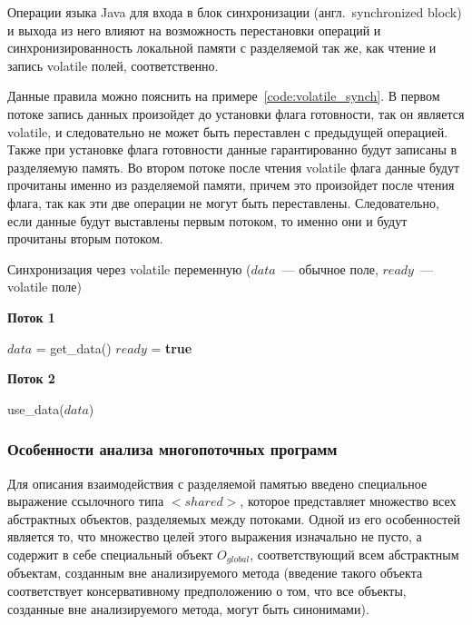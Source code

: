 \documentclass[14pt,titlepage]{extarticle}
\newcommand{\algorithmictitle}[1]{\hspace{8mm}\textbf{#1}}
\newcommand{\BOOLTRUE}{\textbf{true }}
\newcommand{\eng}[1]{{\English#1}}
\newcommand{\engdef}[1]{(англ.~\eng{#1})}
\newcommand{\java}{\eng{Java}\xspace}
\begin{document}
      Операции языка \java для входа в блок синхронизации \engdef{synchronized
      block} и выхода из него влияют на возможность перестановки операций и
      синхронизированность локальной памяти с разделяемой так же, как чтение и
      запись \eng{volatile} полей, соответственно.

      Данные правила можно пояснить на примере~\ref{code:volatile_synch}.
      В первом потоке запись данных произойдет до установки флага готовности,
      так он является \eng{volatile}, и следовательно не может быть переставлен
      с предыдущей операцией. Также при установке флага готовности данные
      гарантированно будут записаны в разделяемую память.
      Во втором потоке после чтения \eng{volatile} флага данные будут прочитаны
      именно из разделяемой памяти, причем это произойдет после чтения флага,
      так как эти две операции не могут быть переставлены.
      Следовательно, если данные будут выставлены первым потоком, то именно
      они и будут прочитаны вторым потоком.
      \begin{algorithm}
        \caption{Синхронизация через \eng{volatile} переменную
          ($data$~--- обычное поле, $ready$~--- \eng{volatile} поле)}
        \label{code:volatile_synch}
        \begin{multicols}{2}
          \algorithmictitle{Поток 1}
          \begin{algorithmic}[1]
            \STATE $data$ = get\_data()
            \STATE $ready$ = \BOOLTRUE
          \end{algorithmic}
          \columnbreak
          \algorithmictitle{Поток 2}
          \begin{algorithmic}[1]
            \STATE {}
            \ENDWHILE
            \STATE use\_data($data$)
          \end{algorithmic}
        \end{multicols}
      \end{algorithm}

      \subsubsection{Особенности анализа многопоточных программ}
        \label{sec:shared_introd}

        Для описания взаимодействия с разделяемой памятью введено специальное
        выражение ссылочного типа ${<}shared{>}$, которое представляет
        множество всех абстрактных объектов, разделяемых между потоками. Одной
        из его особенностей является то, что множество целей этого выражения
        изначально не пусто, а содержит в себе специальный объект
        $O_{global}$, соответствующий всем абстрактным объектам, созданным
        вне анализируемого метода (введение такого объекта соответствует
        консервативному предположению о том, что все объекты, созданные вне
        анализируемого метода, могут быть синонимами).
\end{document}
